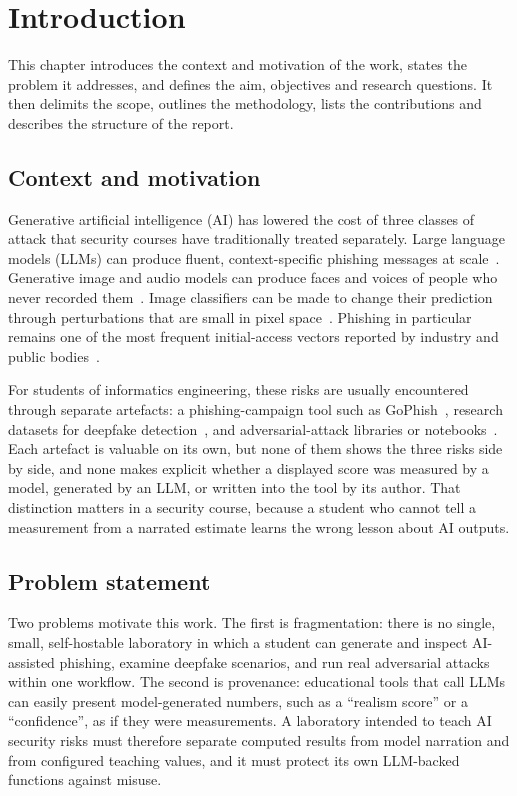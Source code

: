 \chapter{Introduction}
\label{cha:intro}

This chapter introduces the context and motivation of the work, states the problem it addresses, and defines the aim, objectives and research questions. It then delimits the scope, outlines the methodology, lists the contributions and describes the structure of the report.

\section{Context and motivation}
\label{sec:context}

Generative artificial intelligence (AI) has lowered the cost of three classes of attack that security courses have traditionally treated separately. Large language models (LLMs) can produce fluent, context-specific phishing messages at scale~\cite{hazell2023spear,heiding2024devising}. Generative image and audio models can produce faces and voices of people who never recorded them~\cite{karras2019stylegan,mirsky2021deepfake}. Image classifiers can be made to change their prediction through perturbations that are small in pixel space~\cite{szegedy2014intriguing,goodfellow2015explaining}. Phishing in particular remains one of the most frequent initial-access vectors reported by industry and public bodies~\cite{enisa2024threat,apwg2024}.

For students of informatics engineering, these risks are usually encountered through separate artefacts: a phishing-campaign tool such as GoPhish~\cite{gophish}, research datasets for deepfake detection~\cite{rossler2019faceforensics,li2020celebdf}, and adversarial-attack libraries or notebooks~\cite{kim2020torchattacks}. Each artefact is valuable on its own, but none of them shows the three risks side by side, and none makes explicit whether a displayed score was measured by a model, generated by an LLM, or written into the tool by its author. That distinction matters in a security course, because a student who cannot tell a measurement from a narrated estimate learns the wrong lesson about AI outputs.

\section{Problem statement}
\label{sec:problem}

Two problems motivate this work. The first is fragmentation: there is no single, small, self-hostable laboratory in which a student can generate and inspect AI-assisted phishing, examine deepfake scenarios, and run real adversarial attacks within one workflow. The second is provenance: educational tools that call LLMs can easily present model-generated numbers, such as a ``realism score'' or a ``confidence'', as if they were measurements. A laboratory intended to teach AI security risks must therefore separate computed results from model narration and from configured teaching values, and it must protect its own LLM-backed functions against misuse.

